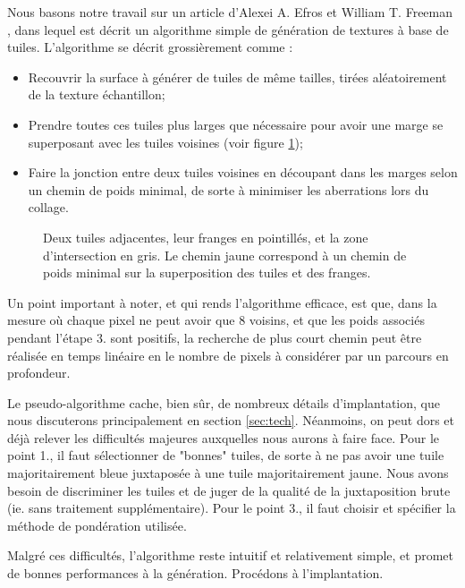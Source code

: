 \documentclass{article}
\begin{document}
Nous basons notre travail sur un article d'Alexei A. Efros et William T. Freeman \cite{efros2001image}, dans lequel est décrit un algorithme simple de génération de textures à base de tuiles. L'algorithme se décrit grossièrement comme :

\begin{itemize}
    \item[1.] Recouvrir la surface à générer de tuiles de même tailles, tirées aléatoirement de la texture échantillon;
    \item[2.] Prendre toutes ces tuiles plus larges que nécessaire pour avoir une marge se superposant avec les tuiles voisines (voir figure \ref{fig:tile});
    \item[3.] Faire la jonction entre deux tuiles voisines en découpant dans les marges selon un chemin de poids minimal, de sorte à minimiser les aberrations lors du collage.
\end{itemize}

\begin{figure}
    \centering
    \scalebox{1.2}{}
	\caption{Deux tuiles adjacentes, leur franges en pointillés, et la zone d'intersection en gris. Le chemin jaune correspond à un chemin de poids minimal sur la superposition des tuiles et des franges.\label{fig:tile}}
\end{figure}

Un point important à noter, et qui rends l'algorithme efficace, est que, dans la mesure où chaque pixel ne peut avoir que 8 voisins, et que les poids associés pendant l'étape 3. sont positifs, la recherche de plus court chemin peut être réalisée en temps linéaire en le nombre de pixels à considérer par un parcours en profondeur.

Le pseudo-algorithme cache, bien sûr, de nombreux détails d'implantation, que nous discuterons principalement en section \ref{sec:tech}. Néanmoins, on peut dors et déjà relever les difficultés majeures auxquelles nous aurons à faire face.
Pour le point 1., il faut sélectionner de "bonnes" tuiles, de sorte à ne pas avoir une tuile majoritairement bleue juxtaposée à une tuile majoritairement jaune. Nous avons besoin de discriminer les tuiles et de juger de la qualité de la juxtaposition brute (ie. sans traitement supplémentaire). Pour le point 3., il faut choisir et spécifier la méthode de pondération utilisée. 

Malgré ces difficultés, l'algorithme reste intuitif et relativement simple, et promet de bonnes performances à la génération. Procédons à l'implantation.
\end{document}
